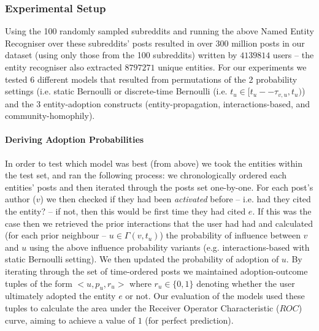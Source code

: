 \documentclass[sigconf]{acmart}
\begin{document}
\subsubsection{Experimental Setup}
Using the 100 randomly sampled subreddits and running the above Named Entity Recogniser over these subreddits' posts resulted in over $300$ million posts in our dataset (using only those from the 100 subreddits) written by $4 139 814$ users -- the entity recogniser also extracted $8 797 271$ unique entities.
For our experiments we tested 6 different models that resulted from permutations of the 2 probability settings (i.e. static Bernoulli or discrete-time Bernoulli (i.e. $t_u \in [t_u -- \tau_{v,u}, t_u)$) and the 3 entity-adoption constructs (entity-propagation, interactions-based, and community-homophily).

\paragraph{Deriving Adoption Probabilities}
In order to test which model was best (from above) we took the entities within the test set, and ran the following process: we chronologically ordered each entities' posts and then iterated through the posts set one-by-one.
For each post's author ($v$) we then checked if they had been \emph{activated} before -- i.e. had they cited the entity? -- if not, then this would be first time they had cited $e$.
If this was the case then we retrieved the prior interactions that the user had had and calculated (for each prior neighbour -- $u \in \Gamma(v, t_u)$) the probability of influence between $v$ and $u$ using the above influence probability variants (e.g. interactions-based with static Bernoulli setting).
We then updated the probability of adoption of $u$.
By iterating through the set of time-ordered posts we maintained adoption-outcome tuples of the form $<u, p_u, r_u>$ where $r_u \in \{0,1\}$ denoting whether the user ultimately adopted the entity $e$ or not.
Our evaluation of the models used these tuples to calculate the area under the Receiver Operator Characteristic ($ROC$) curve, aiming to achieve a value of $1$ (for perfect prediction).
\end{document}

